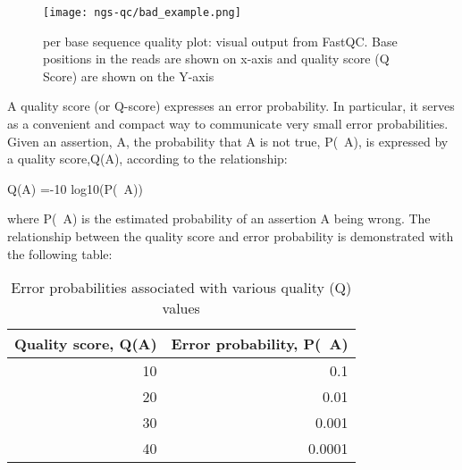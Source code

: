 \begin{figure}[htb]
\centering
\texttt{[image: ngs-qc/bad\_example.png]}
\caption{per base sequence quality plot: visual output from FastQC. Base positions in the reads are shown on x-axis and quality score (Q Score) are shown on the Y-axis}
\label{fig:bad_example_plot}
\end{figure}

\begin{information}
A quality score (or Q-score) expresses an error probability.  In particular, it
serves as a convenient and compact way to communicate very small error
probabilities.
Given an assertion, A, the probability that A is not true, P(~A), is expressed
by a quality score,Q(A), according to the relationship:

Q(A) =-10 log10(P(~A))

where P(~A) is the estimated probability of an assertion A being wrong.
The relationship between the quality score and error probability is demonstrated
with the following table:

\begin{table}[htbp]
  \centering
  \caption{Error probabilities associated with various quality (Q) values}
    \begin{tabular}{rr}
    \toprule
    \textbf{Quality score, Q(A)} & \textbf{Error probability, P(~A)} \\
    \midrule
    10    & 0.1 \\
    20    & 0.01 \\
    30    & 0.001 \\
    40    & 0.0001 \\
    \bottomrule
    \end{tabular}%
  \label{tab:addlabel}%
\end{table}%

\end{information}

